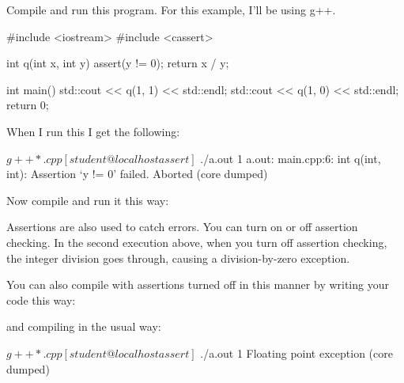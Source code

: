 \newpage{}

Compile and run this program. For this example, I'll be
using g++.

\begin{console}
#include <iostream>
#include <cassert>

int q(int x, int y)
{   
    assert(y != 0);
    return x / y;
}

int main()
{   
    std::cout << q(1, 1) << std::endl;
    std::cout << q(1, 0) << std::endl;
    return 0;
}
\end{console}

When I run this I get the following:

\begin{console}
$ g++ *.cpp
[student@localhost assert]$ ./a.out
1
a.out: main.cpp:6: int q(int, int): Assertion `y != 0'{}
failed.
Aborted (core dumped)
\end{console}

Now compile and run it this way:

Assertions are also used to catch errors. You can turn on or off
assertion checking. In the second execution above, when you turn off
assertion checking, the integer division goes through, causing a
division-by-zero exception.

You can also compile with assertions turned off in this manner by
writing your code this way:


and compiling in the usual way:

\begin{console}
$ g++ *.cpp
[student@localhost assert]$ ./a.out
1
Floating point exception (core dumped)
\end{console}

